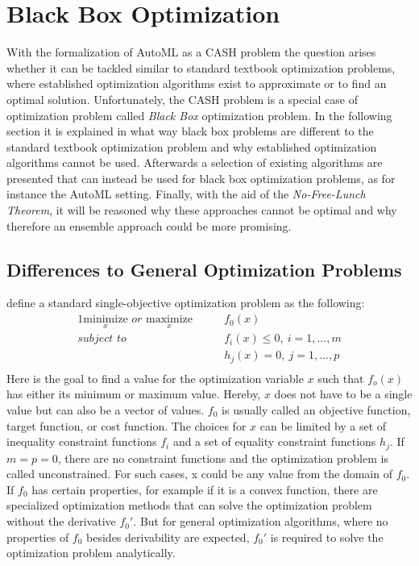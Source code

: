 \section{Black Box Optimization}
\label{sec:theory:optimization}
With the formalization of AutoML as a CASH problem the question arises whether it can be tackled similar to standard textbook optimization problems, where established optimization algorithms exist to approximate or to find an optimal solution.
Unfortunately, the CASH problem is a special case of optimization problem called \textit{Black Box} optimization problem.\newline
In the following section it is explained in what way black box problems are different to the standard textbook optimization problem and why established optimization algorithms cannot be used.
Afterwards a selection of existing algorithms are presented that can instead be used for black box optimization problems, as for instance the AutoML setting.
Finally, with the aid of the \textit{No-Free-Lunch Theorem}, it will be reasoned why these approaches cannot be optimal and why therefore an ensemble approach could be more promising.

\subsection{Differences to General Optimization Problems}
\label{sec:theory:optimization:differences}
\textcite{Boyd-Optimization} define a standard single-objective optimization problem as the following:
\begin{alignat*}{1}
    \underset{x}{\mathrm{minimize}} \textit{ or } \underset{x}{\mathrm{maximize}} \qquad & f_0(x)\\
    \textit{subject to} \qquad & f_i(x) \leq 0,\> i=1,...,m\\
                        &  h_j(x) = 0,\> j=1,...,p\\
\end{alignat*}
Here is the goal to find a value for the optimization variable $x$ such that $f_o(x)$ has either its minimum or maximum value.
Hereby, $x$ does not have to be a single value but can also be a vector of values.
$f_0$ is usually called an objective function, target function, or cost function.\newline
The choices for $x$ can be limited by a set of inequality constraint functions $f_i$ and a set of equality constraint functions $h_j$.
If $m=p=0$, there are no constraint functions and the optimization problem is called unconstrained.
For such cases, x could be any value from the domain of $f_0$.\newline
If $f_0$ has certain properties, for example if it is a convex function, there are specialized optimization methods that can solve the optimization problem without the derivative $f_0'$.
But for general optimization algorithms, where no properties of $f_0$ besides derivability are expected, $f_0'$ is required to solve the optimization problem analytically.

